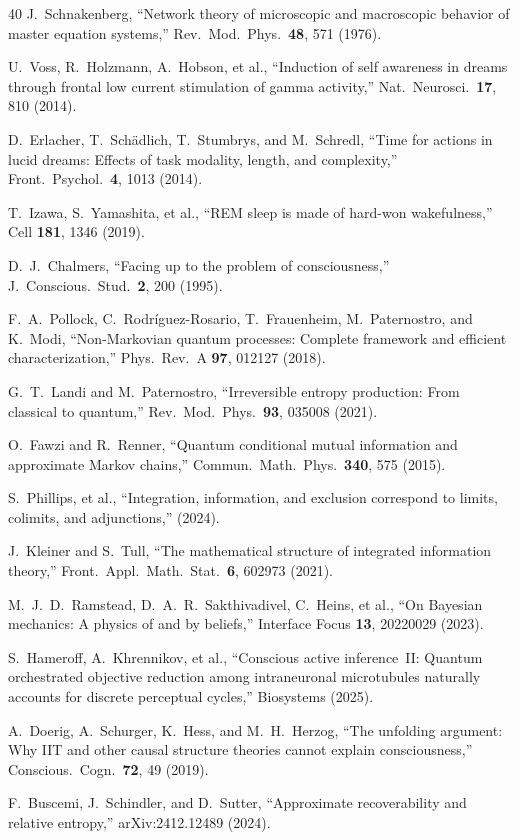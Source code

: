 \documentclass[prl,twocolumn,superscriptaddress,longbibliography,floatfix]{revtex4-2}
\begin{document}
\begin{thebibliography}{40}
J.~Schnakenberg,
``Network theory of microscopic and macroscopic behavior of master
equation systems,''
Rev.\ Mod.\ Phys.\ \textbf{48}, 571 (1976).

U.~Voss, R.~Holzmann, A.~Hobson, et al.,
``Induction of self awareness in dreams through frontal low current
stimulation of gamma activity,''
Nat.\ Neurosci.\ \textbf{17}, 810 (2014).

D.~Erlacher, T.~Sch\"{a}dlich, T.~Stumbrys, and M.~Schredl,
``Time for actions in lucid dreams: Effects of task modality, length,
and complexity,''
Front.\ Psychol.\ \textbf{4}, 1013 (2014).

T.~Izawa, S.~Yamashita, et al.,
``REM sleep is made of hard-won wakefulness,''
Cell \textbf{181}, 1346 (2019).

D.~J.~Chalmers,
``Facing up to the problem of consciousness,''
J.\ Conscious.\ Stud.\ \textbf{2}, 200 (1995).

F.~A.~Pollock, C.~Rodr\'{i}guez-Rosario, T.~Frauenheim,
M.~Paternostro, and K.~Modi,
``Non-Markovian quantum processes: Complete framework and efficient
characterization,''
Phys.\ Rev.\ A \textbf{97}, 012127 (2018).

G.~T.~Landi and M.~Paternostro,
``Irreversible entropy production: From classical to quantum,''
Rev.\ Mod.\ Phys.\ \textbf{93}, 035008 (2021).

O.~Fawzi and R.~Renner,
``Quantum conditional mutual information and approximate Markov
chains,''
Commun.\ Math.\ Phys.\ \textbf{340}, 575 (2015).

S.~Phillips, et al.,
``Integration, information, and exclusion correspond to limits,
colimits, and adjunctions,''
(2024).

J.~Kleiner and S.~Tull,
``The mathematical structure of integrated information theory,''
Front.\ Appl.\ Math.\ Stat.\ \textbf{6}, 602973 (2021).

M.~J.~D.~Ramstead, D.~A.~R.~Sakthivadivel,
C.~Heins, et al.,
``On Bayesian mechanics: A physics of and by beliefs,''
Interface Focus \textbf{13}, 20220029 (2023).

S.~Hameroff, A.~Khrennikov, et al.,
``Conscious active inference~II: Quantum orchestrated objective
reduction among intraneuronal microtubules naturally accounts for
discrete perceptual cycles,''
Biosystems (2025).

A.~Doerig, A.~Schurger, K.~Hess, and M.~H.~Herzog,
``The unfolding argument: Why IIT and other causal structure theories
cannot explain consciousness,''
Conscious.\ Cogn.\ \textbf{72}, 49 (2019).

F.~Buscemi, J.~Schindler, and D.~Sutter,
``Approximate recoverability and relative entropy,''
arXiv:2412.12489 (2024).

\end{thebibliography}
\end{document}
